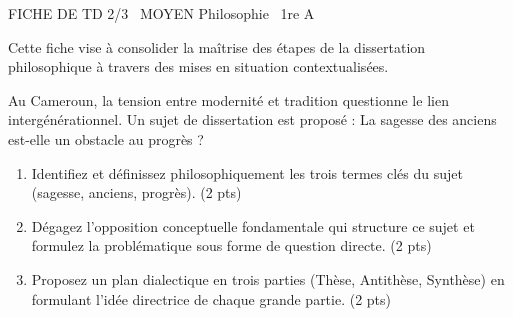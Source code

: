 \documentclass[11pt]{article}
\begin{document}
\begin{tcolorbox}[enhanced,colback=popink,colframe=popink,arc=10pt,boxrule=0pt,left=12pt,right=12pt,top=9pt,bottom=9pt]
{\color{white}\popxbold\small FICHE DE TD 2/3 \textbullet\ MOYEN \hfill Philosophie \textbullet\ 1re A\par}
\end{tcolorbox}
\vspace{4pt}
Cette fiche vise à consolider la maîtrise des étapes de la dissertation philosophique à travers des mises en situation contextualisées.

\begin{exercice}
Au Cameroun, la tension entre modernité et tradition questionne le lien intergénérationnel. Un sujet de dissertation est proposé : \og La sagesse des anciens est-elle un obstacle au progrès ? \fg{}
\begin{enumerate}
    \item Identifiez et définissez philosophiquement les trois termes clés du sujet (sagesse, anciens, progrès). (2 pts)
    \item Dégagez l'opposition conceptuelle fondamentale qui structure ce sujet et formulez la problématique sous forme de question directe. (2 pts)
    \item Proposez un plan dialectique en trois parties (Thèse, Antithèse, Synthèse) en formulant l'idée directrice de chaque grande partie. (2 pts)
\end{enumerate}
\end{exercice}
\end{document}
